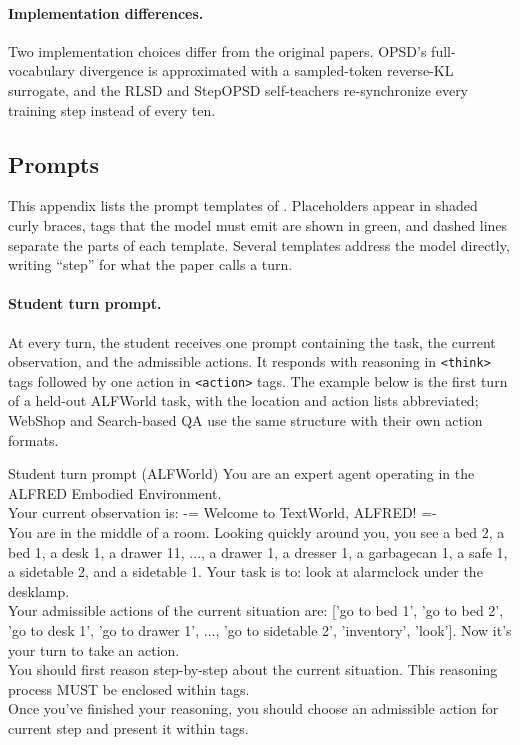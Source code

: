 \paragraph{Implementation differences.} Two implementation choices differ from the original papers. OPSD's full-vocabulary divergence is approximated with a sampled-token reverse-KL surrogate, and the RLSD and StepOPSD self-teachers re-synchronize every training step instead of every ten.

\subsection{Prompts}
\label{app:prompts}

This appendix lists the prompt templates of \method{}. Placeholders appear in shaded curly braces, tags that the model must emit are shown in green, and dashed lines separate the parts of each template. Several templates address the model directly, writing ``step'' for what the paper calls a turn.

\paragraph{Student turn prompt.} At every turn, the student receives one prompt containing the task, the current observation, and the admissible actions. It responds with reasoning in \texttt{<think>} tags followed by one action in \texttt{<action>} tags. The example below is the first turn of a held-out ALFWorld task, with the location and action lists abbreviated; WebShop and Search-based QA use the same structure with their own action formats.

\begin{promptbox}{Student turn prompt (ALFWorld)}
You are an expert agent operating in the ALFRED Embodied Environment.\\
Your current observation is: -= Welcome to TextWorld, ALFRED! =-\\[5pt]
You are in the middle of a room. Looking quickly around you, you see a bed 2, a bed 1, a desk 1, a drawer 11, ..., a drawer 1, a dresser 1, a garbagecan 1, a safe 1, a sidetable 2, and a sidetable 1.
\promptsep
Your task is to: look at alarmclock under the desklamp.\\
Your admissible actions of the current situation are: ['go to bed 1', 'go to bed 2', 'go to desk 1', 'go to drawer 1', ..., 'go to sidetable 2', 'inventory', 'look'].
\promptsep
Now it's your turn to take an action.\\
You should first reason step-by-step about the current situation. This reasoning process MUST be enclosed within  tags.\\
Once you've finished your reasoning, you should choose an admissible action for current step and present it within  tags.
\end{promptbox}

